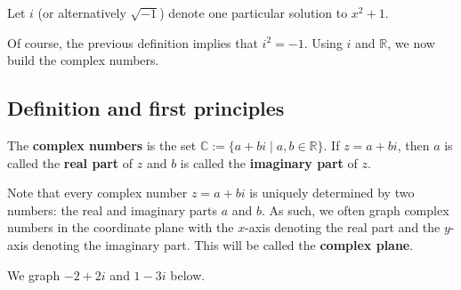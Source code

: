 \begin{definition}
Let $i$ (or alternatively $\sqrt{-1}$) denote one particular solution to $x^2 +1$. 
\end{definition}

Of course, the previous definition implies that $i^2 = -1$. Using $i$ and $\mathbb{R}$, we now build the complex numbers.

\subsection{Definition and first principles}

\begin{definition}
The \textbf{complex numbers} is the set $\mathbb{C} := \{a + bi\mid a,b \in \mathbb{R}\}$. If $z=a+bi$, then $a$ is called the \textbf{real part} of $z$ and $b$ is called the \textbf{imaginary part} of $z$.
\end{definition}

Note that every complex number $z=a+bi$ is uniquely determined by two numbers: the real and imaginary parts $a$ and $b$. As such, we often graph complex numbers in the coordinate plane with the $x$-axis denoting the real part and the $y$-axis denoting the imaginary part. This will be called the \textbf{complex plane}.

\begin{example}
We graph $-2 + 2i$ and  $1 - 3i$ below.
\begin{center}
\end{center}
\end{example}

